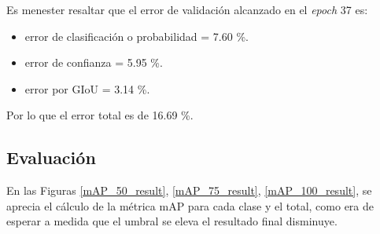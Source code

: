 Es menester resaltar que el error de validación alcanzado en el \textit{epoch} 37 es:
\begin{itemize}
    \item error de clasificación o probabilidad = 7.60 \%.
    \item error de confianza = 5.95 \%.
    \item error por GIoU = 3.14 \%.
\end{itemize}
Por lo que el error total es de 16.69 \%.
\subsection{Evaluación}
En las Figuras \ref{mAP_50_result}, \ref{mAP_75_result}, \ref{mAP_100_result}, se aprecia el cálculo de la métrica mAP para cada clase y el total, como era de esperar a medida que el umbral se eleva el resultado final disminuye.
